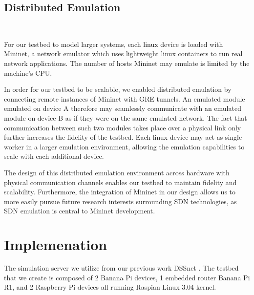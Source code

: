 \subsection{Distributed Emulation}
\

For our testbed to model larger systems, each linux device is loaded with Mininet, a network emulator which uses lightweight linux containers to run real network applications. The number of hosts Mininet may emulate is limited by the machine's CPU.

In order for our testbed to be scalable, we enabled distributed emulation by connecting remote instances of Mininet with GRE tunnels. An emulated module emulated on device A therefore may seamlessly communicate with an emulated module on device B as if they were on the same emulated network. The fact that communication between such two modules takes place over a physical link only further increases the fidelity of the testbed. Each linux device may act as single worker in a larger emulation environment, allowing the emulation capabilities to scale with each additional device.

The design of this distributed emulation environment across hardware with physical communication channels enables our testbed to maintain fidelity and scalability. Furthermore, the integration of Mininet in our design allows us to more easily pursue future research interests surrounding SDN technologies, as SDN emulation is central to Mininet development.

\section{Implemenation}

The simulation server we utilize from our previous work DSSnet \cite{Hannon:2016}.
The testbed that we create is composed of 2 Banana Pi devices, 1 embedded router Banana Pi R1, and 2 Raspberry Pi devices all running Raspian Linux 3.04 kernel.

